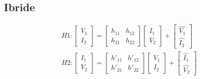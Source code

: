 \documentclass{article}
\begin{document}
    \hfill
    \begin{minipage}[t]{.5\textwidth}
        \vspace{-\baselineskip}

        \subsection*{Ibride}
        \vspace{-\baselineskip}

            \begin{align*}
                &H1:
                    \begin{bmatrix}
                        V_1\\
                        I_2
                    \end{bmatrix}
                    =
                    \begin{bmatrix}
                        h_{11} & h_{12}\\
                        h_{21} & h_{22}
                    \end{bmatrix}
                    \begin{bmatrix}
                        I_1\\
                        V_2
                    \end{bmatrix}
                    +
                    \begin{bmatrix}
                        \hat{V_1}\\
                        \hat{I_2}
                    \end{bmatrix}\\
                &H2:
                    \begin{bmatrix}
                        I_1\\
                        V_2
                    \end{bmatrix}
                    =
                    \begin{bmatrix}
                        h'_{11} & h'_{12}\\
                        h'_{21} & h'_{22}
                    \end{bmatrix}
                    \begin{bmatrix}
                        V_1\\
                        I_2
                    \end{bmatrix}
                    +
                    \begin{bmatrix}
                        \hat{I_1}\\
                        \hat{V_2}
                    \end{bmatrix}
            \end{align*}


\end{minipage}
\end{document}
